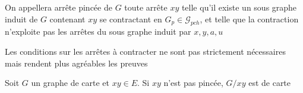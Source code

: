 \documentclass{scrartcl}
\begin{document}
\begin{flushleft}
\begin{figure}[h]
\begin{center}

    \end{center}
\end{figure}

\begin{def*}
    On appellera arrête pincée de $G$ toute arrête $xy$ telle qu'il existe un sous graphe induit de $G$ contenant $xy$ se contractant en
    $G_p \in \mathcal{G}_{pch}$, et telle que la contraction n'exploite pas les arrêtes du sous graphe induit par $x,y,a,u$
\end{def*}

Les conditions sur les arrêtes à contracter ne sont pas strictement nécessaires mais rendent plus agréables les preuves

\begin{prop}
    Soit $G$ un graphe de carte et $xy \in E$. Si $xy$ n'est pas pincée, $G / xy$ est de carte
\end{prop}


\end{flushleft}
\end{document}
